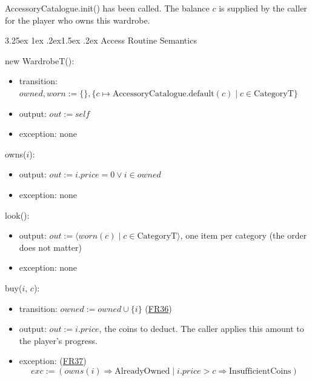 \documentclass[10pt, titlepage]{article}
\makeatletter
\newcommand{\srsurl}{https://team-hindsight.github.io/ophthamology-game/SRS/SRS.pdf}
\newcommand{\srsitemref}[2]{\href{\srsurl\#nameddest=#1}{#2}}
\renewcommand\paragraph{\@startsection{paragraph}{4}{\z@}%
  {3.25ex \@plus 1ex \@minus .2ex}{1.5ex \@plus .2ex}%
  {\normalfont\normalsize\bfseries}}
\newcommand{\T}[1]{\mathit{#1}}          %
\newcommand{\out}{\mathit{out}}
\newcommand{\exc}{\mathit{exc}}
\makeatother
\begin{document}
AccessoryCatalogue.init() has been called. The balance $c$ is supplied
by the caller for the player who owns this wardrobe.

\paragraph{Access Routine Semantics}

\begin{samepage}
\noindent new WardrobeT():
\begin{itemize}
\item transition: $\T{owned}, \T{worn} := \{\}, \{c \mapsto \text{AccessoryCatalogue.default}(c) \mid c \in \text{CategoryT}\}$
\item output: $\out := \T{self}$
\item exception: none
\end{itemize}
\end{samepage}
\par\pagebreak[0]

\begin{samepage}
\noindent owns($i$):
\begin{itemize}
\item output: $\out := i.\T{price} = 0 \vee i \in \T{owned}$
\item exception: none
\end{itemize}
\end{samepage}
\par\pagebreak[0]

\begin{samepage}
\noindent look():
\begin{itemize}
\item output: $\out := \langle \T{worn}(c) \mid c \in \text{CategoryT}\rangle$,
  one item per category (the order does not matter)
\item exception: none
\end{itemize}
\end{samepage}
\par\pagebreak[0]

\begin{samepage}
\noindent buy($i$, $c$):
\begin{itemize}
\item transition: $\T{owned} := \T{owned} \cup \{i\}$ (\srsitemref{FR_Purchase}{FR36})
\item output: $\out := i.\T{price}$, the coins to deduct. The caller
  applies this amount to the player's progress.
\item exception: (\srsitemref{FR_PurchaseRefused}{FR37})
  \[\exc := (\T{owns}(i) \Rightarrow \text{AlreadyOwned} \mid i.\T{price} >
  c \Rightarrow \text{InsufficientCoins})\]
\end{itemize}
\end{samepage}
\par\pagebreak[0]
\end{document}
